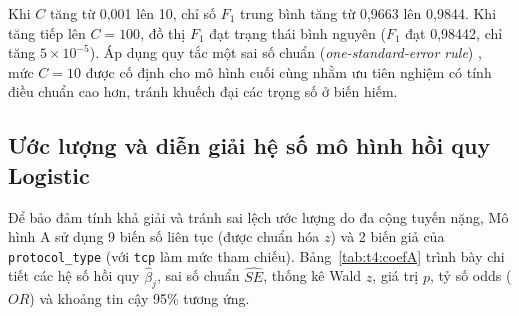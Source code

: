 Khi $C$ tăng từ 0,001 lên 10, chỉ số $F_1$ trung bình tăng từ 0,9663 lên 0,9844. Khi tăng tiếp lên $C=100$, đồ thị $F_1$ đạt trạng thái bình nguyên ($F_1$ đạt 0,98442, chỉ tăng $5\times 10^{-5}$). Áp dụng quy tắc một sai số chuẩn (\textit{one-standard-error rule}) \cite{task4_hastie2009}, mức $C=10$ được cố định cho mô hình cuối cùng nhằm ưu tiên nghiệm có tính điều chuẩn cao hơn, tránh khuếch đại các trọng số ở biến hiếm.

\subsection{Ước lượng và diễn giải hệ số mô hình hồi quy Logistic}
Để bảo đảm tính khả giải và tránh sai lệch ước lượng do đa cộng tuyến nặng, Mô hình A sử dụng 9 biến số liên tục (được chuẩn hóa $z$) và 2 biến giả của \texttt{protocol\_type} (với \texttt{tcp} làm mức tham chiếu). Bảng~\ref{tab:t4:coefA} trình bày chi tiết các hệ số hồi quy $\hat\beta_j$, sai số chuẩn $\widehat{SE}$, thống kê Wald $z$, giá trị $p$, tỷ số odds ($OR$) và khoảng tin cậy 95\% tương ứng.

